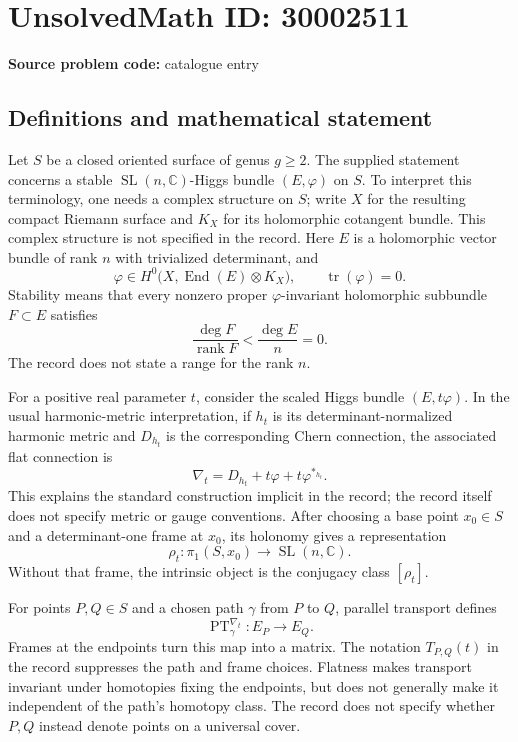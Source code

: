\documentclass[11pt]{article}
\newcommand{\C}{\mathbb{C}}
\begin{document}
\section*{UnsolvedMath ID: 30002511}
\textbf{Source problem code:} catalogue entry
\subsection{Definitions and mathematical statement}
Let \(S\) be a closed oriented surface of genus \(g\geq 2\). The supplied statement concerns a stable \(\operatorname{SL}(n,\C)\)-Higgs bundle \((E,\varphi)\) on \(S\). To interpret this terminology, one needs a complex structure on \(S\); write \(X\) for the resulting compact Riemann surface and \(K_X\) for its holomorphic cotangent bundle. This complex structure is not specified in the record. Here \(E\) is a holomorphic vector bundle of rank \(n\) with trivialized determinant, and
\[
\varphi\in H^0\bigl(X,\operatorname{End}(E)\otimes K_X\bigr),\qquad \operatorname{tr}(\varphi)=0.
\]
Stability means that every nonzero proper \(\varphi\)-invariant holomorphic subbundle \(F\subset E\) satisfies
\[
\frac{\deg F}{\operatorname{rank}F}<\frac{\deg E}{n}=0.
\]
The record does not state a range for the rank \(n\).

For a positive real parameter \(t\), consider the scaled Higgs bundle \((E,t\varphi)\). In the usual harmonic-metric interpretation, if \(h_t\) is its determinant-normalized harmonic metric and \(D_{h_t}\) is the corresponding Chern connection, the associated flat connection is
\[
\nabla_t=D_{h_t}+t\varphi+t\varphi^{*_{h_t}}.
\]
This explains the standard construction implicit in the record; the record itself does not specify metric or gauge conventions. After choosing a base point \(x_0\in S\) and a determinant-one frame at \(x_0\), its holonomy gives a representation
\[
\rho_t:\pi_1(S,x_0)\longrightarrow\operatorname{SL}(n,\C).
\]
Without that frame, the intrinsic object is the conjugacy class \([\rho_t]\).

For points \(P,Q\in S\) and a chosen path \(\gamma\) from \(P\) to \(Q\), parallel transport defines
\[
\operatorname{PT}^{\nabla_t}_{\gamma}:E_P\longrightarrow E_Q.
\]
Frames at the endpoints turn this map into a matrix. The notation \(T_{P,Q}(t)\) in the record suppresses the path and frame choices. Flatness makes transport invariant under homotopies fixing the endpoints, but does not generally make it independent of the path's homotopy class. The record does not specify whether \(P,Q\) instead denote points on a universal cover.
\end{document}
